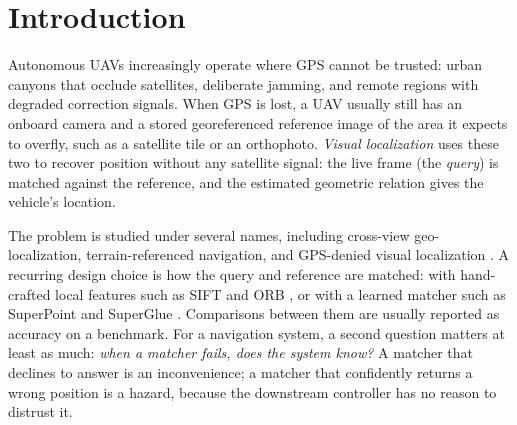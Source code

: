 \documentclass[conference]{IEEEtran}
\begin{document}
\section{Introduction}

Autonomous UAVs increasingly operate where GPS cannot be trusted: urban canyons that occlude satellites, deliberate jamming, and remote regions with degraded correction signals. When GPS is lost, a UAV usually still has an onboard camera and a stored georeferenced reference image of the area it expects to overfly, such as a satellite tile or an orthophoto. \emph{Visual localization} uses these two to recover position without any satellite signal: the live frame (the \emph{query}) is matched against the reference, and the estimated geometric relation gives the vehicle's location.

The problem is studied under several names, including cross-view geo-localization, terrain-referenced navigation, and GPS-denied visual localization \cite{zheng2020university,zhu2021vigor,goforth2019gps}. A recurring design choice is how the query and reference are matched: with hand-crafted local features such as SIFT \cite{lowe2004distinctive} and ORB \cite{rublee2011orb}, or with a learned matcher such as SuperPoint and SuperGlue \cite{detone2018superpoint,sarlin2020superglue}. Comparisons between them are usually reported as accuracy on a benchmark. For a navigation system, a second question matters at least as much: \emph{when a matcher fails, does the system know?} A matcher that declines to answer is an inconvenience; a matcher that confidently returns a wrong position is a hazard, because the downstream controller has no reason to distrust it.
\end{document}
